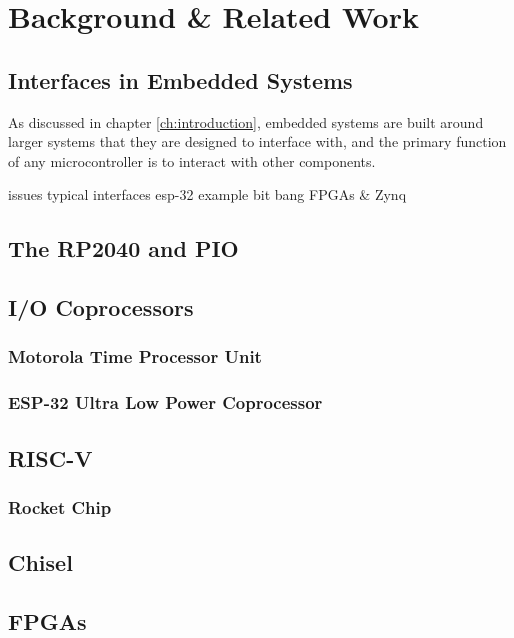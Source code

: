 \chapter{Background \& Related Work}
\label{ch:background}

\section{Interfaces in Embedded Systems}

As discussed in chapter \ref{ch:introduction}, embedded systems are built around larger systems that they are designed to interface with, and the primary function of any microcontroller is to interact with other components.

issues
typical interfaces
esp-32 example
bit bang
FPGAs \& Zynq

\section{The RP2040 and PIO}

\section{I/O Coprocessors}
\subsection{Motorola Time Processor Unit}

\subsection{ESP-32 Ultra Low Power Coprocessor}

\section{RISC-V}

\subsection{Rocket Chip}

\section{Chisel}

\section{FPGAs}
